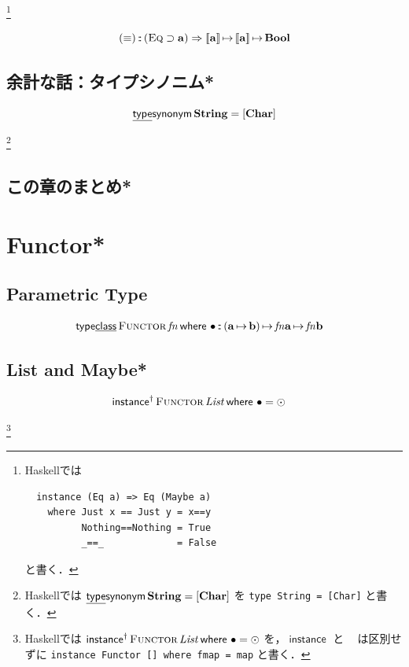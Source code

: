 \documentclass[a4paper,twocolumn]{jsbook}
\def\[{\left[\!\left[}
\def\]{\right]\!\right]}
\newcommand{\programminglanguage}[1]{\textsf{#1}}
\newcommand{\haskell}{\programminglanguage{Haskell}}
\newcommand{\code}[1]{\texttt{#1}}
\newcommand{\mKeyword}[1]{\mathsf{#1}} %
\newcommand{\mKeywordUnderline}[1]{\text{\underline{\textsf{#1}}}} %
\newcommand{\mInstanceKeyword}{\mKeyword{instance}}
\newcommand{\mTypeClass}{\mKeyword{type}\mKeywordUnderline{class}}
\newcommand{\mTypeSynonymKeyword}{\mKeywordUnderline{type}\mKeyword{synonym}}
\newcommand{\mWhereKeyword}{\mKeyword{where}}
\DeclareMathOperator{\mInstance}{\mInstanceKeyword}
\DeclareMathOperator{\mInstanceParametric}{\mInstanceKeyword^{\dagger}}
\DeclareMathOperator{\mTypeSynonym}{\mTypeSynonymKeyword}
\DeclareMathOperator{\mWhere}{\mWhereKeyword}
\DeclareMathOperator{\mIn}{{:\!:}}
\DeclareMathOperator{\mLetEq}{\triangleq}
\DeclareMathOperator{\mMap}{\bullet}
\DeclareMathOperator{\mMapList}{\odot}
\DeclareMathOperator{\mMapsTo}{\mapsto}
\newcommand{\mType}[1]{\mathbf{#1}}
\newcommand{\mListWith}[1]{\left[#1\right]}
\newcommand{\mMaybeWith}[1]{\[#1\]}
\newcommand{\mBoolType}{\mType{Bool}}
\newcommand{\mCharType}{\mType{Char}}
\newcommand{\mListType}[1]{\mListWith{\mType{#1}}}
\newcommand{\mMaybeType}[1]{\mMaybeWith{\mType{#1}}}
\newcommand{\mStringType}{\mType{String}}
\newcommand{\mTypeConstructor}[1]{\mathit{#1}} %
\DeclareMathOperator{\mListTypeConstructor}{\mTypeConstructor{List}}
\newcommand{\mSpecialTypeClass}[1]{\textsc{#1}} %
\newcommand{\mEqTypeClass}{\mSpecialTypeClass{Eq}}
\newcommand{\mFunctorTypeClass}{\mSpecialTypeClass{Functor}}
\newcommand{\mProj}[2]{#1\mMapsTo#2}
\newcommand{\mWhere}[2]{\mathbin{\mWhereKeyword}#1\mLetEq#2}
\begin{document}
{}\footnote{\haskell では
\begin{verbatim}
  instance (Eq a) => Eq (Maybe a)
    where Just x == Just y = x==y
          Nothing==Nothing = True
          _==_             = False
\end{verbatim}
と書く．
}

$$
(\equiv)\mIn{}(\mEqTypeClass\supset\mType{a})\Rightarrow\mProj{\mMaybeType{a}}{\mProj{\mMaybeType{a}}{\mBoolType}}
$$

\section{余計な話：タイプシノニム*}

$$
\mTypeSynonym\mStringType=\mListType{\mCharType}
$$

{}\footnote{\haskell では $\mTypeSynonym\mStringType=\mListType{\mCharType}$ を \code{type String = [Char]} と書く．}

\section{この章のまとめ*}


\chapter{Functor*}


\section{Parametric Type}

\begin{align*}
\mTypeClass\mathop{\mFunctorTypeClass}\mTypeConstructor{fn}\mWhere{}
&\mMap\mIn{}\mProj{(\mProj{\mType{a}}{\mType{b}})}{\mProj{\mTypeConstructor{fn}\mType{a}}{\mTypeConstructor{fn}\mType{b}}}
\end{align*}


\section{List and Maybe*}

\begin{align*}
\mInstanceParametric\mathop{\mFunctorTypeClass}\mListTypeConstructor\mWhere{}
&\mMap=\mMapList
\end{align*}

{}\footnote{\haskell では $\mInstanceParametric\mathop{\mFunctorTypeClass}\mListTypeConstructor\mWhere{}
\mMap=\mMapList$ を，$\mInstance$ と $\mInstanceParametric$ は区別せずに \code{instance Functor [] where fmap = map} と書く．}
\end{document}
